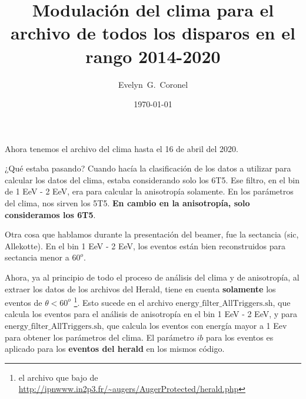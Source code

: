 



\title{Modulación del clima para el archivo de todos los disparos en el rango 2014-2020}
\author{Evelyn~G.~Coronel}


\date[]{\lowercase{\today}} %


\maketitle

Ahora tenemos el archivo del clima hasta el 16 de abril del 2020.

¿Qué estaba pasando? Cuando hacía la clasificación de los datos a utilizar para calcular los datos del clima, estaba considerando solo los 6T5. Ese filtro, en el bin de 1 EeV - 2 EeV, era para calcular la anisotropía solamente. En los parámetros del clima, nos sirven los 5T5. \textbf{En cambio en la anisotropía, solo consideramos los 6T5}.


Otra cosa que hablamos durante la presentación del beamer, fue la sectancia (sic, Allekotte). En el bin 1 EeV - 2 EeV, los eventos están bien reconstruidos
para sectancia menor a $60^o$.


Ahora, ya al principio de todo el proceso de análisis del clima y de anisotropía, al extraer los datos de los archivos del Herald, tiene en cuenta \textbf{solamente} los eventos de $\theta < 60^o$ \footnote{el archivo que bajo de \url{http://ipnwww.in2p3.fr/~augers/AugerProtected/herald.php} }. Esto sucede en el archivo $\text{energy\_filter\_AllTriggers.sh}$, que calcula los eventos para el análisis de anisotropía en el bin 1 EeV - 2 EeV, y para $\text{energy\_filter\_AllTriggers.sh}$, que calcula los eventos con energía mayor a 1 Eev para obtener los parámetros del clima. El parámetro $ib$ para los eventos es aplicado para los \textbf{eventos del herald } en los mismos código. 

